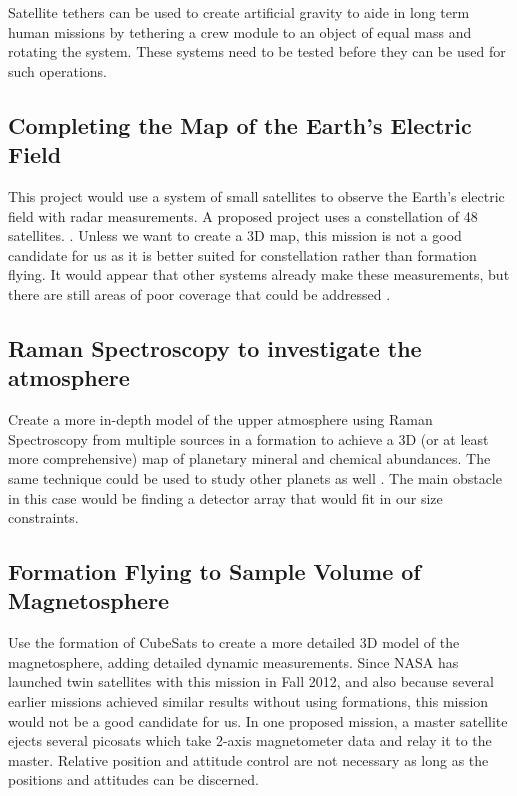 Satellite tethers can be used to create artificial gravity to aide in long term human missions by tethering a crew module to an object of equal mass and rotating the system. These systems need to be tested before they can be used for such operations. \cite{Ref:Carlson}\cite{Ref:Mazzoleni}

\subsection{Completing the Map of the Earth's Electric Field}

This project would use a system of small satellites to observe the Earth's electric field with radar measurements. A proposed project uses a constellation of 48 satellites. \cite{Ref:Redd}. Unless we want to create a 3D map, this mission is not a good candidate for us as it is better suited for constellation rather than formation flying. It would appear that other systems already make these measurements, but there are still areas of poor coverage that could be addressed \cite{Ref:ElecMap}. 

\subsection{Raman Spectroscopy to investigate the atmosphere}

Create a more in-depth model of the upper atmosphere using Raman Spectroscopy from multiple sources in a formation to achieve a 3D (or at least more comprehensive) map of planetary mineral and chemical abundances. The same technique could be used to study other planets as well \cite{Ref:Cantrell}. The main obstacle in this case would be finding a detector array that would fit in our size constraints. 

\subsection{Formation Flying to Sample Volume of Magnetosphere}

Use the formation of CubeSats to create a more detailed 3D model of the magnetosphere, adding detailed dynamic measurements. Since NASA has launched twin satellites with this mission in Fall 2012, and also because several earlier missions achieved similar results without using formations, this mission would not be a good candidate for us\cite{Ref:Mag3D}. In one proposed mission, a master satellite ejects several picosats which take 2-axis magnetometer data and relay it to the master. Relative position and attitude control are not necessary as long as the positions and attitudes can be discerned.\cite{Ref:Clarke}

